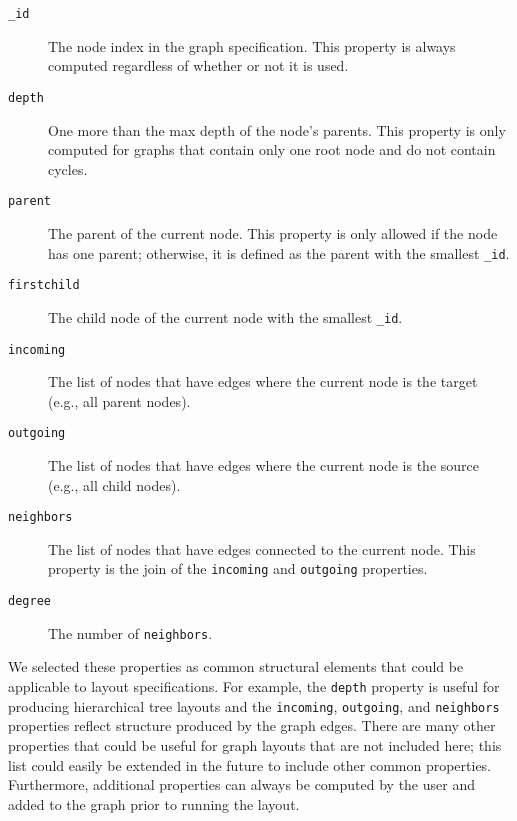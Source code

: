 \begin{description}
\item[\texttt{\_id}] The node index in the graph specification. This
  property is always computed regardless of whether or not it is used.
\item[\texttt{depth}] One more than the max depth of the node's
  parents. This property is only computed for graphs that contain only one
  root node and do not contain cycles. 
\item[\texttt{parent}] The parent of the current node. This property is
  only allowed if the node has one parent; otherwise, it is defined as the
  parent with the smallest \texttt{\_id}.
\item[\texttt{firstchild}] The child node of the current node with the smallest \texttt{\_id}.
\item[\texttt{incoming}] The list of nodes that have edges where the
  current node is the target (e.g., all parent nodes).
\item[\texttt{outgoing}] The list of nodes that have edges where the
  current node is the source (e.g., all child nodes).
\item[\texttt{neighbors}] The list of nodes that have edges connected to
  the current node. This property is the join of the \texttt{incoming} and
  \texttt{outgoing} properties.
\item[\texttt{degree}] The number of \texttt{neighbors}.
\end{description}


We selected these properties as common structural elements that could be
applicable to layout specifications. For example, the \texttt{depth}
property is useful for producing hierarchical tree layouts and the 
\texttt{incoming}, \texttt{outgoing}, and \texttt{neighbors} properties
reflect structure produced by the graph edges. There are many other
properties that could be useful for graph layouts that are not included 
here; this list could easily be extended in the future to include other
common properties. Furthermore, additional properties can always be
computed by the user and added to the graph prior to running the layout.